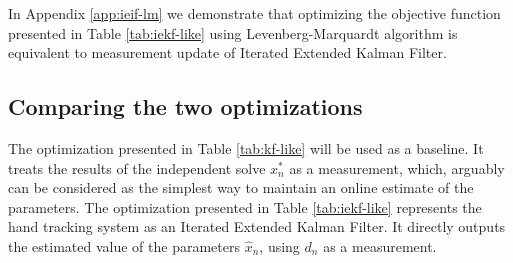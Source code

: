 \documentclass[10pt,twocolumn,letterpaper]{article}
\begin{document}
\begin{table}[!h] 
\centering
\caption{Objective function of IEKF \label{tab:iekf-like}} 
\end{table}

In Appendix \ref{app:ieif-lm} we demonstrate that optimizing the objective function presented in Table \ref{tab:iekf-like} using Levenberg-Marquardt algorithm is equivalent to measurement update of Iterated Extended Kalman Filter.

\subsection{Comparing the two optimizations}
The optimization presented in Table \ref{tab:kf-like} will be used as a baseline. It treats the results of the independent solve $x_n^*$ as a measurement, which, arguably can be considered as the simplest way to maintain an online estimate of the parameters. 
The optimization presented in Table \ref{tab:iekf-like} represents the hand tracking system as an Iterated Extended Kalman Filter. It directly outputs the estimated value of the parameters $\hat{x}_n$, using $d_n$ as a measurement.

 

{\small


}
\end{document}

